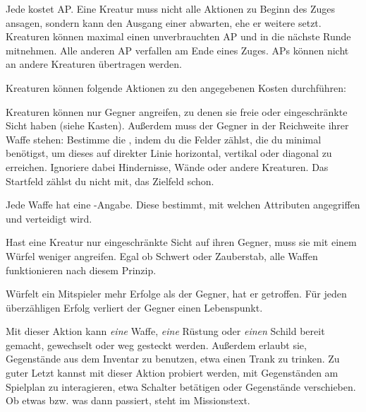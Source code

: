 {		Jede  kostet AP. Eine Kreatur muss nicht alle Aktionen zu Beginn des Zuges ansagen, sondern kann den Ausgang einer abwarten, ehe er weitere setzt. Kreaturen können maximal einen unverbrauchten AP  und in die nächste Runde mitnehmen. Alle anderen AP verfallen am Ende eines Zuges. APs können nicht an andere Kreaturen übertragen werden.

		Kreaturen können folgende Aktionen zu den angegebenen Kosten durchführen:

		\medskip
		\medskip

			Kreaturen können nur Gegner angreifen, zu denen sie freie oder eingeschränkte Sicht haben (siehe Kasten). Außerdem muss der Gegner in der Reichweite ihrer Waffe stehen: Bestimme die , indem du die Felder zählst, die du minimal benötigst, um dieses auf direkter Linie horizontal, vertikal oder diagonal zu erreichen. Ignoriere dabei Hindernisse, Wände oder andere Kreaturen. Das Startfeld zählst du nicht mit, das Zielfeld schon.

			Jede Waffe hat eine -Angabe. Diese bestimmt, mit welchen Attributen angegriffen und verteidigt wird.


			\noindent
			Hast eine Kreatur nur eingeschränkte Sicht auf ihren Gegner, muss sie mit einem Würfel weniger angreifen. Egal ob Schwert oder Zauberstab, alle Waffen funktionieren nach diesem Prinzip.

			Würfelt ein Mitspieler mehr Erfolge als der Gegner, hat er getroffen. Für jeden überzähligen Erfolg verliert der Gegner einen Lebenspunkt.

			Mit dieser Aktion kann \emph{eine} Waffe, \emph{eine} Rüstung oder \emph{einen} Schild bereit gemacht, gewechselt oder weg gesteckt werden. Außerdem erlaubt sie, Gegenstände aus dem Inventar zu benutzen, etwa einen Trank zu trinken. Zu guter Letzt kannst mit dieser Aktion probiert werden, mit Gegenständen am Spielplan zu interagieren, etwa Schalter betätigen oder Gegenstände verschieben. Ob etwas bzw. was dann passiert, steht im Missionstext.

}
